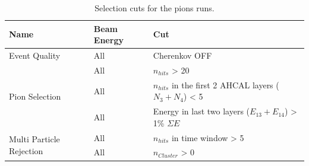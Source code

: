 \documentclass{JINST}
\begin{document}
\begin{table}[htb!]
  \centering
  \caption{Selection cuts for the pions runs.}
  \label{table:pion_sel}
  \begin{tabular}{@{}lll@{}}
    \toprule
    \multicolumn{1}{l}{\textbf{Name}} & \textbf{Beam Energy} & \textbf{Cut}\\
    \midrule
    \multirow{1}{*}{Event Quality}& All & Cherenkov OFF\\
    \midrule
    \multirow{3}{*}{Pion Selection}& All & $n_{hits}$ > 20 \\& All & $n_{hits}$ in the first 2 AHCAL layers ($N_3 + N_4$) < 5 \\& All & Energy in last two layers ($E_{13} + E_{14}$) > 1\% $\Sigma E$ \\
    \midrule
    \multirow{2}{*}{Multi Particle Rejection}& All & $n_{hits}$ in time window > 5 \\& All & $n_{Cluster}$ > 0 \\
    \bottomrule
  \end{tabular}
\end{table}
\end{document}
